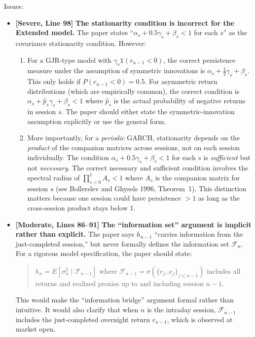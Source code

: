 \documentclass[12pt,a4paper]{article}
\begin{document}
\noindent \textcolor{errorred}{Issues:}
\begin{itemize}[nosep]
\item [\textcolor{errorred}{S2}] \textbf{[Severe, Line 98]} \textbf{The stationarity condition is incorrect for the Extended model.} The paper states ``$\alpha_s + 0.5\gamma_s + \beta_s < 1$ for each $s$'' as the covariance stationarity condition. However:
  \begin{enumerate}[nosep]
  \item For a GJR-type model with $\gamma_s \mathbb{1}(r_{n-1}<0)$, the correct persistence measure under the assumption of symmetric innovations is $\alpha_s + \frac{1}{2}\gamma_s + \beta_s$. This only holds if $P(r_{n-1}<0) = 0.5$. For asymmetric return distributions (which are empirically common), the correct condition is $\alpha_s + \hat{p}_s \gamma_s + \beta_s < 1$ where $\hat{p}_s$ is the actual probability of negative returns in session $s$. The paper should either state the symmetric-innovation assumption explicitly or use the general form.
  \item More importantly, for a \emph{periodic} GARCH, stationarity depends on the \emph{product} of the companion matrices across sessions, not on each session individually. The condition $\alpha_s + 0.5\gamma_s + \beta_s < 1$ for each $s$ is \emph{sufficient} but not \emph{necessary}. The correct necessary and sufficient condition involves the spectral radius of $\prod_{s=0}^{1} A_s < 1$ where $A_s$ is the companion matrix for session $s$ (see Bollerslev and Ghysels 1996, Theorem~1). This distinction matters because one session could have persistence $>1$ as long as the cross-session product stays below 1.
  \end{enumerate}

\item [\textcolor{warncolor}{M6}] \textbf{[Moderate, Lines 86--91]} \textbf{The ``information set'' argument is implicit rather than explicit.} The paper says $h_{n-1}$ ``carries information from the just-completed session,'' but never formally defines the information set $\mathcal{F}_n$. For a rigorous model specification, the paper should state:
  \begin{quote}
  $h_n = E[\sigma^2_n \mid \mathcal{F}_{n-1}]$ where $\mathcal{F}_{n-1} = \sigma(\{r_j, x_j\}_{j \leq n-1})$ includes all returns and realized proxies up to and including session $n-1$.
  \end{quote}
  This would make the ``information bridge'' argument formal rather than intuitive. It would also clarify that when $n$ is the intraday session, $\mathcal{F}_{n-1}$ includes the just-completed overnight return $r_{n-1}$, which is observed at market open.


\end{itemize}
\end{document}
